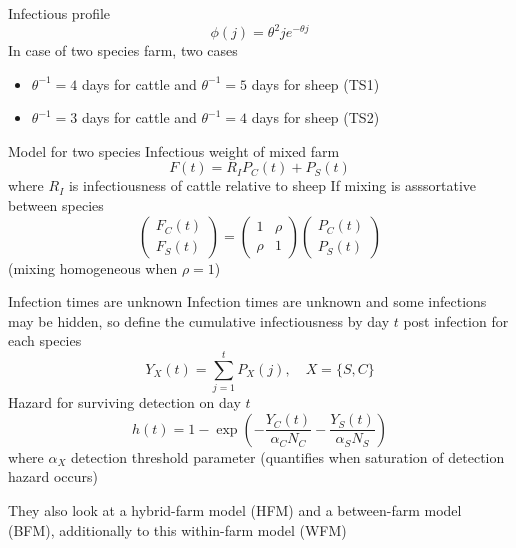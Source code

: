 \documentclass[aspectratio=43]{beamer}
\begin{document}
\begin{frame}{Infectious profile}
  \begin{equation}
    \phi(j) = \theta^2j e^{-\theta j}
  \end{equation}
  \vfill
  In case of two species farm, two cases
  \begin{itemize}
    \item $\theta^{-1}=4$ days for cattle and $\theta^{-1}=5$ days for sheep (TS1)
    \item $\theta^{-1}=3$ days for cattle and $\theta^{-1}=4$ days for sheep (TS2)
  \end{itemize}
\end{frame}

\begin{frame}{Model for two species}
  Infectious weight of mixed farm
  \begin{equation}
    F(t)=R_IP_C(t)+P_S(t)
  \end{equation}
  where $R_I$ is infectiousness of cattle relative to sheep
  \vfill
  If mixing is asssortative between species
  \begin{equation}
    \begin{pmatrix}
      F_C(t) \\
      F_S(t)
    \end{pmatrix}
    =
    \begin{pmatrix}
      1 & \rho \\ \rho & 1
    \end{pmatrix}
    \begin{pmatrix}
      P_C(t)\\ P_S(t)
    \end{pmatrix}
  \end{equation}
  \vfill
  (mixing homogeneous when $\rho=1$)
\end{frame}


\begin{frame}{Infection times are unknown}
  Infection times are unknown and some infections may be hidden, so define the cumulative infectiousness by day $t$ post infection for each species
  \[
    Y_X(t)=\sum_{j=1}^tP_X(j),\quad X=\{S,C\}
  \]
  \vfill
  Hazard for surviving detection on day $t$
  \[
    h(t)=1-\exp\left(
      -\frac{Y_C(t)}{\alpha_CN_C}
      -\frac{Y_S(t)}{\alpha_SN_S}
      \right)
  \]
  where $\alpha_X$ detection threshold parameter (quantifies when saturation of detection hazard occurs)
\end{frame}

\begin{frame}
  They also look at a hybrid-farm model (HFM) and a between-farm model (BFM), additionally to this within-farm model (WFM)
\end{frame}
\end{document}
